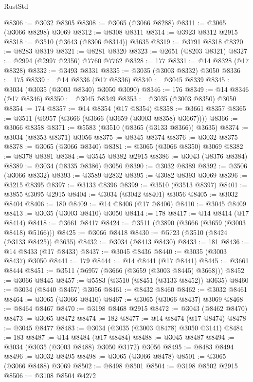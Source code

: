\begin{lexlean}{RustStd}
\begin{coremodule}
@8306 := @3032 @8305
@8308 := @3065 (@3066 @8288)
@8311 := @3065 (@3066 @8298) @3069
@8312 := @8308 @8311
@8314 := @3923 @8312 @2915
@8318 := @3510 (@3643 (@8306 @8314)) @3635
@8319 := @3791 @8318
@8320 := @8283 @8319
@8321 := @8281 @8320
@8323 := @2651 (@8203 @8321)
@8327 := @2994 (@2997 @2356) @7760 @7762
@8328 := 177
@8331 := @14 @8328 (@17 @8328)
@8332 := @3493 @8331
@8335 := @3035 (@3003 @8332) @3050
@8336 := 175
@8339 := @14 @8336 (@17 @8336)
@8340 := @3045 @8339
@8345 := @3034 (@3035 (@3003 @8340) @3050 @3090)
@8346 := 176
@8349 := @14 @8346 (@17 @8346)
@8350 := @3045 @8349
@8353 := @3035 (@3003 @8350) @3050
@8354 := 174
@8357 := @14 @8354 (@17 @8354)
@8358 := @3661 @8357
@8365 := @3511 (@6957 (@3666 (@3666 (@3659 (@3003 @8358) @3667))))
@8366 := @3066 @8358
@8371 := @5583 (@3510 (@8365 (@3133 @8366)) @3635)
@8374 := @3034 (@8353 @8371) @3056
@8375 := @8345 @8374
@8376 := @3032 @8375
@8378 := @3065 (@3066 @8340)
@8381 := @3065 (@3066 @8350) @3069
@8382 := @8378 @8381
@8384 := @3545 @8382 @2915
@8386 := @3043 (@8376 @8384)
@8389 := @3034 (@8335 @8386) @3056
@8390 := @3032 @8389
@8392 := @3506 (@3066 @8332)
@8393 := @3589 @2832
@8395 := @3082 @8393 @3069
@8396 := @3215 @8395
@8397 := @3133 @8396
@8399 := @3510 (@3513 @8397)
@8401 := @3855 @3095 @2915
@8404 := @3034 (@3042 @8401) @3056
@8405 := @3032 @8404
@8406 := 180
@8409 := @14 @8406 (@17 @8406)
@8410 := @3045 @8409
@8413 := @3035 (@3003 @8410) @3050
@8414 := 178
@8417 := @14 @8414 (@17 @8414)
@8418 := @3661 @8417
@8424 := @3511 (@3890 (@3666 (@3659 (@3003 @8418) @5166)))
@8425 := @3066 @8418
@8430 := @5723 (@3510 (@8424 (@3133 @8425)) @3635)
@8432 := @3034 (@8413 @8430)
@8433 := 181
@8436 := @14 @8433 (@17 @8433)
@8437 := @3045 @8436
@8440 := @3035 (@3003 @8437) @3050
@8441 := 179
@8444 := @14 @8441 (@17 @8441)
@8445 := @3661 @8444
@8451 := @3511 (@6957 (@3666 (@3659 (@3003 @8445) @3668)))
@8452 := @3066 @8445
@8457 := @5583 (@3510 (@8451 (@3133 @8452)) @3635)
@8460 := @3034 (@8440 @8457) @3056
@8461 := @8432 @8460
@8462 := @3032 @8461
@8464 := @3065 (@3066 @8410)
@8467 := @3065 (@3066 @8437) @3069
@8468 := @8464 @8467
@8470 := @3198 @8468 @2915
@8472 := @3043 (@8462 @8470)
@8473 := @3065 @8472
@8474 := 182
@8477 := @14 @8474 (@17 @8474)
@8478 := @3045 @8477
@8483 := @3034 (@3035 (@3003 @8478) @3050 @3141)
@8484 := 183
@8487 := @14 @8484 (@17 @8484)
@8488 := @3045 @8487
@8494 := @3034 (@3035 (@3003 @8488) @3050 @3172) @3056
@8495 := @8483 @8494
@8496 := @3032 @8495
@8498 := @3065 (@3066 @8478)
@8501 := @3065 (@3066 @8488) @3069
@8502 := @8498 @8501
@8504 := @3198 @8502 @2915
@8506 := @3108 @8504 @4272

\end{coremodule}
\end{lexlean}

